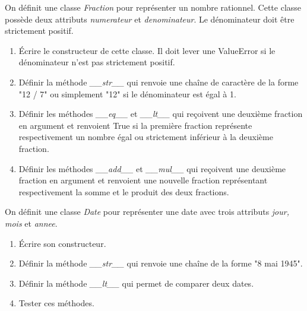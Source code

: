 \documentclass[a4paper,11pt]{article}
\begin{document}
\begin{Form}
\begin{exo}
\begin{enumerate}
\end{enumerate}
\end{exo}
\begin{exo}
On définit une classe \emph{Fraction} pour représenter un nombre rationnel. Cette classe possède deux attributs \emph{numerateur} et \emph{denominateur}. Le dénominateur doit être strictement positif.
\begin{enumerate}
\item Écrire le constructeur de cette classe. Il doit lever une ValueError si le dénominateur n'est pas strictement positif.
\item Définir la méthode \emph{\_\_str\_\_} qui renvoie une chaîne de caractère de la forme "12 / 7" ou simplement "12" si le dénominateur est égal à 1.
\item Définir les méthodes \emph{\_\_eq\_\_} et \emph{\_\_lt\_\_} qui reçoivent une deuxième fraction en argument et renvoient True si la première fraction représente respectivement un nombre égal ou strictement inférieur à la deuxième fraction.
\item Définir les méthodes \emph{\_\_add\_\_} et \emph{\_\_mul\_\_} qui reçoivent une deuxième fraction en argument et renvoient une nouvelle fraction représentant respectivement la somme et le produit des deux fractions.
\end{enumerate}
\end{exo}
\begin{exo}
On définit une classe \emph{Date} pour représenter une date avec trois attributs \emph{jour, mois} et \emph{annee}.
\begin{enumerate}
\item Écrire son constructeur.
\item Définir la méthode \emph{\_\_str\_\_} qui renvoie une chaîne de la forme "8 mai 1945".
\item Définir la méthode \emph{\_\_lt\_\_} qui permet de comparer deux dates.
\item Tester ces méthodes.
\end{enumerate}
\end{exo}
\end{Form}
\end{document}
